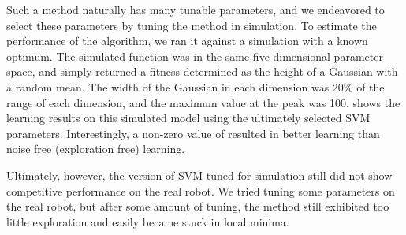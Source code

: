 \begin{itemize}
  Such a method naturally has many tunable parameters, and we
  endeavored to select these parameters by tuning the method in
  simulation.  To estimate the performance of the algorithm, we ran it
  against a simulation with a known optimum.  The simulated function
  was in the same five dimensional parameter space, and simply
  returned a fitness determined as the height of a Gaussian with a
  random mean.  The width of the Gaussian in each dimension was 20\%
  of the range of each dimension, and the maximum value at the peak
  was 100.   shows the learning results on
  this simulated model using the ultimately selected SVM parameters.
  Interestingly, a non-zero value of  resulted in better
  learning than noise free (exploration free) learning.

  Ultimately, however, the version of SVM tuned for simulation still
  did not show competitive performance on the real robot.  We tried
  tuning some parameters on the real robot, but after some amount of
  tuning, the method still exhibited too little exploration and easily
  became stuck in local minima.




\end{itemize}

